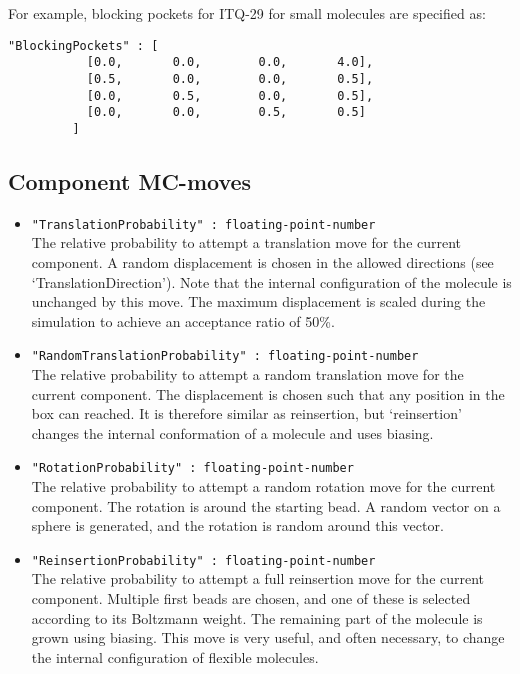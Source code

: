 \begin{itemize}
For example, blocking pockets for ITQ-29 for small molecules are specified as:
\begin{verbatim}
"BlockingPockets" : [
           [0.0,       0.0,        0.0,       4.0],
           [0.5,       0.0,        0.0,       0.5],
           [0.0,       0.5,        0.0,       0.5],
           [0.0,       0.0,        0.5,       0.5]
         ]
\end{verbatim}
\end{itemize}

\subsection{Component MC-moves}

\begin{itemize}

\item{\verb+"TranslationProbability" : floating-point-number+}\\
The relative probability to attempt a translation move for the current component. 
A random displacement is chosen in the allowed directions (see `TranslationDirection').
Note that the internal configuration of the molecule is unchanged by this move. 
The maximum displacement is scaled during the simulation to achieve an acceptance
ratio of 50\%.
\item{\verb+"RandomTranslationProbability" : floating-point-number+}\\
The relative probability to attempt a random translation move for the current component. 
The displacement is chosen such that any position in the box can reached. It is therefore
similar as reinsertion, but `reinsertion' changes the internal conformation of a molecule and uses biasing.
\item{\verb+"RotationProbability" : floating-point-number+}\\
The relative probability to attempt a random rotation move for the current component. 
The rotation is around the starting bead. A random vector on a sphere
is generated, and the rotation is random around this vector.
\item{\verb+"ReinsertionProbability" : floating-point-number+}\\
The relative probability to attempt a full reinsertion move for the current component. 
Multiple first beads are chosen, and one of these is selected according to its Boltzmann weight.
The remaining part of the molecule is grown using biasing. 
This move is very useful, and often necessary, to change the internal configuration of flexible molecules.

\end{itemize}
